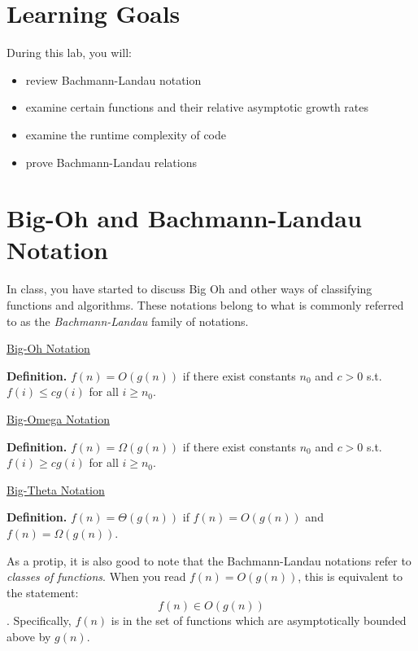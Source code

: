 


\section*{Learning Goals}
During this lab, you will:
\begin{itemize}
    \item review Bachmann-Landau notation
    \item examine certain functions and their relative asymptotic growth rates
    \item examine the runtime complexity of code
    \item prove Bachmann-Landau relations
\end{itemize}

\section*{Big-Oh and Bachmann-Landau Notation}

In class, you have started to discuss Big Oh and other ways of classifying functions and algorithms. These notations belong to what is commonly referred to as the \textit{Bachmann-Landau} family of notations.
    
\begin{framed}\relax
    \begin{center}\relax
        \underline{Big-Oh Notation}
    \end{center}
    \textbf{Definition.} $f(n) = O(g(n))$ if there exist constants $n_0$ and $c > 0$ s.t. $f(i) \leq c g(i)$ for all $i \geq n_0$.
\end{framed}
\begin{framed}
    \begin{center}
        \underline{Big-Omega Notation}
    \end{center}
    \textbf{Definition.} $f(n) = \Omega(g(n))$ if there exist constants $n_0$ and $c > 0$ s.t. $f(i) \geq c g(i)$ for all $i \geq n_0$.
\end{framed}
\begin{framed}
    \begin{center}
        \underline{Big-Theta Notation}
    \end{center}
    \textbf{Definition.} $f(n) = \Theta(g(n))$ if $f(n) = O(g(n))$ and $f(n) = \Omega(g(n))$.
\end{framed}

As a protip, it is also good to note that the Bachmann-Landau notations refer to \textit{classes of functions}. When you read $f(n) = O(g(n))$, this is equivalent to the statement: $$f(n) \in O(g(n))$$. Specifically, $f(n)$ is in the set of functions which are asymptotically bounded above by $g(n)$.

